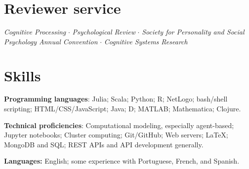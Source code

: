\documentclass[letterpaper,11pt,oneside]{article}
\begin{document}
\noindent
\section*{\textcolor{gunmetal}{Reviewer service}}

  \begin{hangparas}{0.25in}{1}
    \emph{Cognitive Processing} $\cdot$ \emph{Psychological Review} $\cdot$ \emph{Society for Personality and Social Psychology Annual Convention} $\cdot$ \emph{Cognitive Systems Research}
  \end{hangparas}


\noindent
\section*{\textcolor{gunmetal}{Skills}}

\begin{hangparas}{0.25in}{1}
  \textbf{Programming languages}: Julia; Scala; Python; R; NetLogo; bash/shell scripting; 
  HTML/CSS/JavaScript; Java; D; MATLAB; Mathematica; Clojure.

  \textbf{Technical proficiencies}: Computational 
  modeling, especially agent-based; Jupyter notebooks; Cluster computing;
  Git/GitHub; Web servers; \LaTeX; MongoDB and SQL; REST APIs and API
  development generally.

  \textbf{Languages:} English; some experience with Portuguese, French,
  and Spanish.
\end{hangparas}
\end{document}
